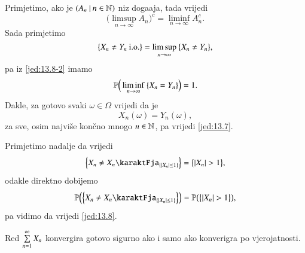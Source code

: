 \begin{nap} \label{nap:13.8-1}
    Primjetimo, ako je $({A_n} \: | \: {n \in \mathbb{N}})$ niz doga\dj aja, tada vrijedi
    \begin{equation}    \label{jed:13.8-2}
        \Big( \limsup\limits_{n \to \infty} A_n \Big)^c = \liminf\limits_{n \to \infty} A_n^c.
    \end{equation}
    Sada primjetimo
    \begin{equation*}
        \{ X_n \neq Y_n \: \mathrm{i.o.} \} = \limsup\limits_{n \to \infty} \: \{ X_n \neq Y_n \},
    \end{equation*}
    pa iz \eqref{jed:13.8-2} imamo
    \begin{equation*}
        \mathbb{P} \Big( \liminf\limits_{n \to \infty} \: \{ X_n = Y_n \} \Big) = 1.
    \end{equation*}
    Dakle, za gotovo svaki $\omega \in \Omega$ vrijedi da je
    \begin{equation*}
        X_n (\omega) = Y_n (\omega),
    \end{equation*}
    za sve, osim najvi\v se kon\v cno mnogo $n \in \mathbb{N}$, pa vrijedi \eqref{jed:13.7}.

    Primjetimo nadalje da vrijedi
    \begin{equation*}
        \Big\{ X_n \neq X_n \karaktFja_{\{ |X_n| \leq 1 \}} \Big\} = \big\{ |X_n| > 1 \big\},
    \end{equation*}
    odakle direktno dobijemo
    \begin{equation*}
        \masP \Big( \Big\{ X_n \neq X_n \karaktFja_{\{ |X_n| \leq 1 \}} \Big\} \Big) = \masP \big( \big\{ |X_n| > 1 \big\} \big),
    \end{equation*}
    pa vidimo da vrijedi \eqref{jed:13.8}.
\end{nap}

\begin{tm}[P. L\' evy]  \label{tm:13.9}
    Red $\sum\limits_{n = 1}^{\infty} X_n$ konvergira gotovo sigurno ako i samo ako konverigra po vjerojatnosti.
\end{tm}

